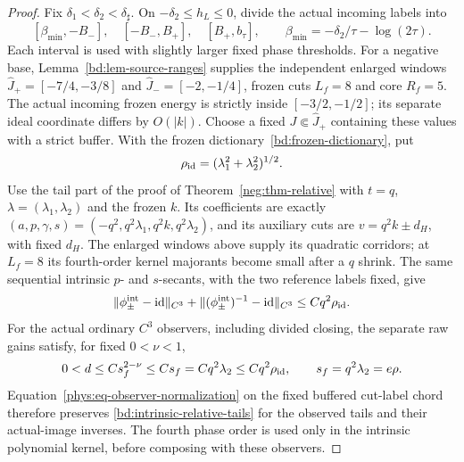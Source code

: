 \begin{proof}
Fix \(\delta_1<\delta_2<\delta_\sharp\).  On
\(-\delta_2\le h_L\le0\), divide the actual incoming labels into
\[
 [\beta_{\min},-B_-],\quad[-B_-,B_+],\quad[B_+,b_\tau],
 \qquad \beta_{\min}=-\delta_2/\tau-\log(2\tau).
\]
Each interval is used with slightly larger fixed phase thresholds.
For a negative base, Lemma~\ref{bd:lem-source-ranges} supplies the
independent enlarged windows $\widehat J_+=[-7/4,-3/8]$ and
$\widehat J_-=[-2,-1/4]$, frozen cuts $L_f=8$ and core $R_f=5$.
The actual incoming frozen energy is strictly inside $[-3/2,-1/2]$;
its separate ideal coordinate differs by $O(|k|)$. Choose a fixed
$J\Subset\widehat J_+$ containing these values with a strict buffer.
With the frozen dictionary~\eqref{bd:frozen-dictionary}, put
\[
 \rho_{\rm id}=(\lambda_1^2+\lambda_2^2)^{1/2}.
\]
Use the tail part of the proof of Theorem~\ref{neg:thm-relative}
with \(t=q\), \(\lambda=(\lambda_1,\lambda_2)\) and the frozen
\(k\). Its coefficients are exactly
\((a,p,\gamma,s)=(-q^2,q^2\lambda_1,q^2k,q^2\lambda_2)\),
and its auxiliary cuts are \(v=q^2k\pm d_H\), with fixed \(d_H\).
The enlarged windows above supply its quadratic corridors;
at \(L_f=8\) its fourth-order kernel majorants become small after
a \(q\) shrink. The same sequential intrinsic \(p\)- and
\(s\)-secants, with the two reference labels fixed, give
\begin{equation}\label{bd:intrinsic-relative-tails}
 \|\phi_\pm^{\rm int}-\mathrm{id}\|_{C^3}
 +\|(\phi_\pm^{\rm int})^{-1}-\mathrm{id}\|_{C^3}
 \le Cq^2\rho_{\rm id}.
\end{equation}
For the actual ordinary \(C^3\) observers, including divided closing,
the separate raw gains satisfy, for fixed \(0<\nu<1\),
\begin{equation}\label{bd:relative-observer-gain}
 0<d\le Cs_f^{2-\nu}\le Cs_f
   =Cq^2\lambda_2\le Cq^2\rho_{\rm id},\qquad
 s_f=q^2\lambda_2=e\rho .
\end{equation}
Equation~\eqref{phys:eq-observer-normalization} on the fixed
buffered cut-label chord therefore preserves
\eqref{bd:intrinsic-relative-tails} for the observed tails and their
actual-image inverses. The fourth phase order is used only in the
intrinsic polynomial kernel, before composing with these observers.


\end{proof}
